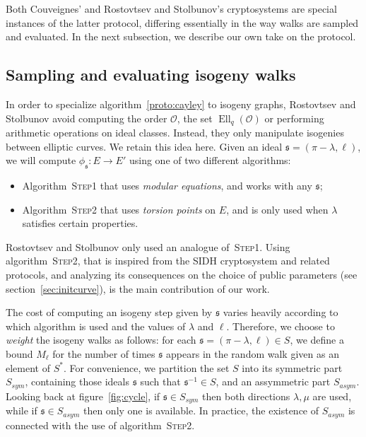 \documentclass{article}
\renewcommand{\O}{\mathcal{O}}
\newcommand{\algstyle}[1]{\textsc{#1}}
\renewcommand{\frak}{\mathfrak}
\theoremstyle{definition}
\DeclareMathOperator{\Ell}{Ell}
\begin{document}
Both Couveignes' and Rostovtsev and Stolbunov's cryptosystems are
special instances of the latter protocol, differing essentially in the
way walks are sampled and evaluated. In the next subsection, we
describe our own take on the protocol.

\subsection{Sampling and evaluating isogeny walks}

In order to specialize algorithm~\ref{proto:cayley} to isogeny graphs,
Rostovtsev and Stolbunov avoid computing the order $\O$, the set $\Ell_q(\O)$
or performing arithmetic operations on ideal classes. Instead, they only
manipulate isogenies between elliptic curves. We retain this idea here.
Given an ideal $\frak s = (\pi-\lambda, \ell)$, we will compute $\phi_{\frak s}:E\to E'$
using one of two different algorithms:
\begin{itemize}
\item Algorithm~\algstyle{Step1} that uses
	\emph{modular equations}, and works with any $\frak s$;
\item Algorithm~\algstyle{Step2} that
	uses \emph{torsion points} on $E$, and is only used when
	$\lambda$ satisfies certain properties.
\end{itemize}

Rostovtsev and Stolbunov only used an analogue of~\algstyle{Step1}. Using
algorithm~\algstyle{Step2}, that is inspired from the SIDH cryptosystem and
related protocols, and analyzing its consequences on the choice of public
parameters (see section~\ref{sec:initcurve}), is the main contribution of our work.

The cost of computing an isogeny step given by $\frak s$
varies heavily according to which algorithm is used and the values of $\lambda$
and $\ell$. Therefore, we choose to \emph{weight} the isogeny walks as
follows: for each $\frak s = (\pi-\lambda,\ell)\in S$,
we define a bound $M_\ell$ for the number of times $\frak s$
appears in the random walk given as an element of $S^*$.
For convenience, we partition the set $S$
into its symmetric part $S_{sym}$, containing those ideals $\frak s$ such that
$\frak s^{-1}\in S$, and an assymmetric part $S_{asym}$. Looking back at
figure~\ref{fig:cycle}, if $\frak s\in S_{sym}$ then both directions
$\lambda,\mu$ are used, while if $\frak s\in S_{asym}$ then only one is
available. In practice, the existence of $S_{asym}$ is connected with the use of
algorithm~\algstyle{Step2}.
\end{document}
